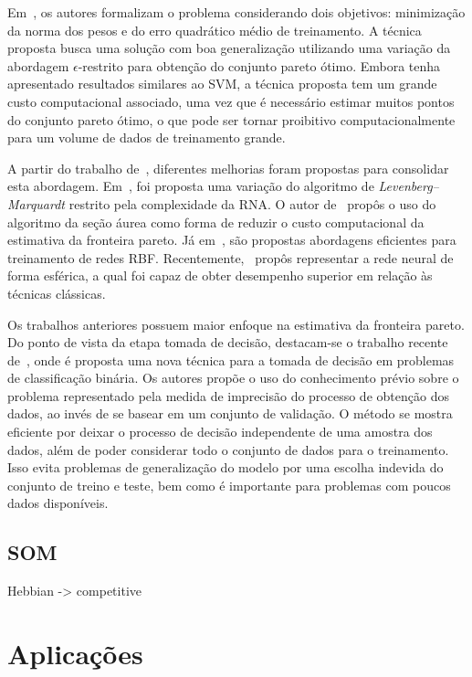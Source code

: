 \documentclass[conference]{IEEEtran}
\begin{document}
	Em~\cite{de2000improving}, os autores formalizam o problema considerando dois objetivos: minimização da norma dos pesos e do erro quadrático médio de treinamento. A técnica proposta busca uma solução com boa generalização utilizando uma variação da abordagem $\epsilon$-restrito para obtenção do conjunto pareto ótimo. Embora tenha apresentado resultados similares ao SVM, a técnica proposta tem um grande custo computacional associado, uma vez que é necessário estimar muitos pontos do conjunto pareto ótimo, o que pode ser tornar proibitivo computacionalmente para um volume de dados de treinamento grande.
	
	A partir do trabalho de~\cite{de2000improving}, diferentes melhorias foram propostas para consolidar esta abordagem. Em~\cite{costa2007improving}, foi proposta uma variação do algoritmo de \textit{Levenberg–Marquardt} restrito pela complexidade da RNA. O autor de~\cite{teixeira2007usage} propôs o uso do algoritmo da seção áurea como forma de reduzir o custo computacional da estimativa da fronteira pareto. Já em~\cite{kokshenev2010efficient, moreira2010lmi}, são propostas abordagens eficientes para treinamento de redes RBF. Recentemente,~\cite{rocha2015training} propôs representar a rede neural de forma esférica, a qual foi capaz de obter desempenho superior em relação às técnicas clássicas.
	
	Os trabalhos anteriores possuem maior enfoque na estimativa da fronteira pareto. Do ponto de vista da etapa tomada de decisão, destacam-se o trabalho recente de~\cite{de2017multi}, onde é proposta uma nova técnica para a tomada de decisão em problemas de classificação binária. Os autores propõe o uso do conhecimento prévio sobre o problema representado pela medida de imprecisão do processo de obtenção dos dados, ao invés de se basear em um conjunto de validação. O método se mostra eficiente por deixar o processo de decisão independente de uma amostra dos dados, além de poder considerar todo o conjunto de dados para o treinamento. Isso evita problemas de generalização do modelo por uma escolha indevida do conjunto de treino e teste, bem como é importante para problemas com poucos dados disponíveis.
	
	
	\subsection{SOM}
	Hebbian -> competitive
	
	\section{Aplicações}
	
\end{document}

